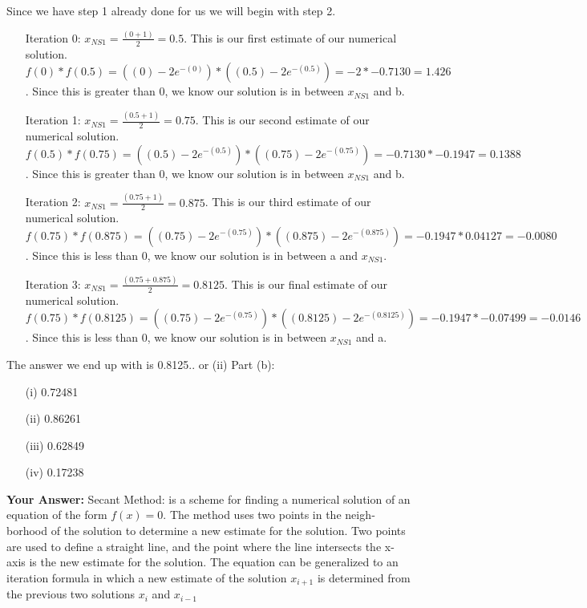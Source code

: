 \documentclass[12pt,a4paper]{report}
\begin{document}
Since we have step 1 already done for us we will begin with step 2.
\begin{itemize}
\item[Iteration 0:] $x_{NS1} = \frac{(0+1)}{2} = 0.5$. This is our first estimate of our numerical solution. $f(0) * f(0.5) = ((0) - 2e^{-(0)}) * ((0.5) - 2e^{-(0.5)}) = -2 * -0.7130 = 1.426$. Since this is greater than 0, we know our solution is in between $x_{NS1}$ and b.
\item[Iteration 1:] $x_{NS1} = \frac{(0.5+1)}{2} = 0.75$. This is our second estimate of our numerical solution. $f(0.5) * f(0.75) = ((0.5) - 2e^{-(0.5)}) * ((0.75) - 2e^{-(0.75)}) = -0.7130 * -0.1947 = 0.1388$. Since this is greater than 0, we know our solution is in between $x_{NS1}$ and b.
\item[Iteration 2:] $x_{NS1} = \frac{(0.75+1)}{2} = 0.875$. This is our third estimate of our numerical solution. $f(0.75) * f(0.875) = ((0.75) - 2e^{-(0.75)}) * ((0.875) - 2e^{-(0.875)}) = -0.1947 * 0.04127 = -0.0080$. Since this is less than 0, we know our solution is in between a and $x_{NS1}$.
\item[Iteration 3:] $x_{NS1} = \frac{(0.75+0.875)}{2} = 0.8125$. This is our final estimate of our numerical solution. $f(0.75) * f(0.8125) = ((0.75) - 2e^{-(0.75)}) * ((0.8125) - 2e^{-(0.8125)}) = -0.1947 * -0.07499 = -0.0146$. Since this is less than 0, we know our solution is in between $x_{NS1}$ and a.
\end{itemize}
The answer we end up with is 0.8125.. or (ii)
\newline
\newline
Part (b):
\begin{itemize}
\item[(i)] 0.72481
\item[(ii)] 0.86261
\item[(iii)] 0.62849
\item[(iv)] 0.17238
\end{itemize}
\textbf{Your Answer:}
\newline
Secant Method: is a scheme for finding a  numerical solution of an equation of the form $f(x) = 0$. The method uses two points in the neigh­borhood of the solution to  determine a new estimate for the solution. Two points are used to define a straight line, and the point where the line intersects the x-axis is the new estimate for the solution. 
\newline
The equation can be generalized to an iteration formula in which a new estimate of the solution $x_{i+1}$ is determined from the previous two solutions $x_i$ and $x_{i-1}$
\end{document}
